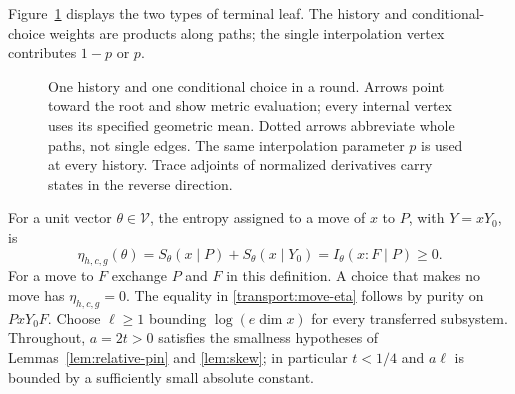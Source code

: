 Figure~\ref{transport:tree-figure} displays the two types of terminal
leaf.  The history and conditional-choice weights are products along
paths; the single interpolation vertex contributes $1-p$ or $p$.
\begin{figure}[H]
\centering
{}
\caption{One history and one conditional choice in a round.  Arrows
point toward the root and show metric evaluation; every internal
vertex uses its specified geometric mean.  Dotted arrows abbreviate
whole paths, not single edges.  The same interpolation parameter $p$
is used at every history.  Trace adjoints of normalized derivatives
carry states in the reverse direction.}
\label{transport:tree-figure}
\end{figure}

For a unit vector $\theta\in\mathcal V$, the entropy assigned to a move
of $x$ to $P$, with $Y=xY_0$, is
\begin{equation}\label{transport:move-eta}
 \eta_{h,c,g}(\theta)
 =S_\theta(x\mid P)+S_\theta(x\mid Y_0)
 =I_\theta(x:F\mid P)\geq0.
\end{equation}
For a move to $F$ exchange $P$ and $F$ in this definition.  A choice
that makes no move has $\eta_{h,c,g}=0$.  The equality in
\eqref{transport:move-eta} follows by purity on $PxY_0F$.
Choose $\ell\geq1$ bounding $\log(e\dim x)$ for every transferred
subsystem.  Throughout, $a=2t>0$ satisfies the smallness hypotheses of
Lemmas~\ref{lem:relative-pin} and \ref{lem:skew}; in particular
$t<1/4$ and $a\ell$ is bounded by a sufficiently small absolute constant.

